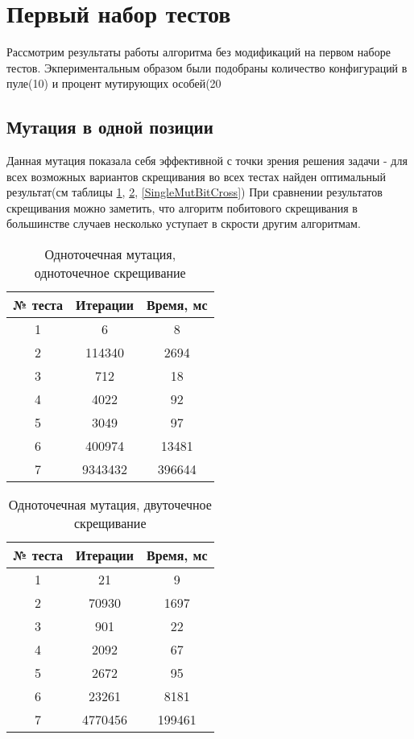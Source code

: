\section{Первый набор тестов}
Рассмотрим результаты работы алгоритма без модификаций на первом наборе тестов. Экпериментальным образом были подобраны количество конфигураций в пуле(10) и процент мутирующих особей(20%
\subsection{Мутация в одной позиции}
Данная мутация показала себя эффективной с точки зрения решения задачи - для всех возможных вариантов скрещивания во всех тестах найден оптимальный результат(см таблицы \ref{SingleMutSingleCross}, \ref{SingleMutDoubleCross}, \ref{SingleMutBitCross})
При сравнении результатов скрещивания можно заметить, что алгоритм побитового скрещивания в большинстве случаев несколько уступает в скрости другим алгоритмам.
\begin{table}[ht]
\centering
\begin{tabular}{|c|c|c|}
\hline
№ теста             & Итерации            & Время, мс            \\ \hline
1                   & 6                   & 8                    \\ \hline
2                   & 114340              & 2694                 \\ \hline
3                   & 712                 & 18                   \\ \hline
4                   & 4022                & 92                   \\ \hline
5                   & 3049                & 97                   \\ \hline
6                   & 400974              & 13481                \\ \hline
7                   & 9343432             & 396644               \\ \hline
\end{tabular}
\caption{Одноточечная мутация, одноточечное скрещивание}
\label{SingleMutSingleCross}
\end{table}

\begin{table}[ht]
\centering
\begin{tabular}{|c|c|c|}
\hline
№ теста & Итерации & Время, мс \\ \hline
1       & 21       & 9         \\ \hline
2       & 70930    & 1697      \\ \hline
3       & 901      & 22        \\ \hline
4       & 2092     & 67        \\ \hline
5       & 2672     & 95        \\ \hline
6       & 23261    & 8181      \\ \hline
7       & 4770456  & 199461    \\ \hline
\end{tabular}
\caption{Одноточечная мутация, двуточечное скрещивание}
\label{SingleMutDoubleCross}
\end{table}

